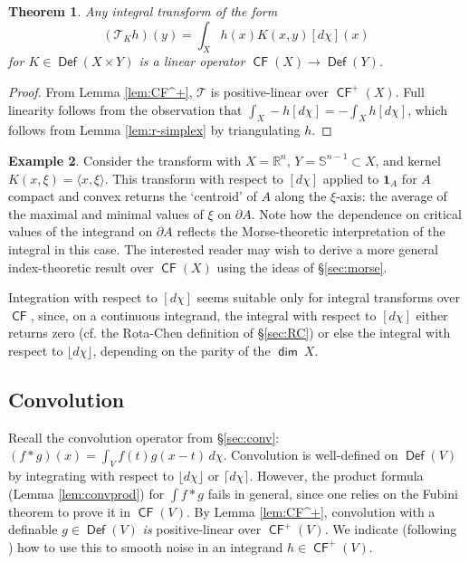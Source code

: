 \documentclass{psapm-l}
\newtheorem{theorem}{Theorem}[section]
\theoremstyle{definition}
\newtheorem{example}[theorem]{Example}
\theoremstyle{remark}
\numberwithin{equation}{section}
\begin{document}
\begin{theorem}
\label{thm:lineartransform}
Any integral transform of the form
\begin{equation}
    ({{\mathcal T}}_K h)(y)
    =  \int_X h(x)K(x,y) [d\chi](x)
\end{equation}
for $K\in{{{\operatorname{\mathsf{{Def}}}}}}(X\times Y)$ is a linear operator ${{{\operatorname{\mathsf{{CF}}}}}}(X)\to{{{\operatorname{\mathsf{{Def}}}}}}(Y)$.
\end{theorem}
\begin{proof}
From Lemma \ref{lem:CF^+}, ${{\mathcal T}}$ is positive-linear over ${{{\operatorname{\mathsf{{CF}}}}}}^+(X)$. Full linearity follows from the observation that $\int_{X} -h [d\chi]  = -\int_{X} h [d\chi]$, which follows from Lemma \ref{lem:r-simplex} by triangulating $h$.
\end{proof}

\begin{example}
Consider the transform with $X={{\mathbb R}}^n$, $Y={{\mathbb S}}^{n-1}\subset X$, and kernel $K(x,\xi)=\langle x,\xi\rangle$. This transform with respect to $[d\chi]$ applied to ${{\mathbf{1}}}_A$ for $A$ compact and convex returns the `centroid' of $A$ along the $\xi$-axis: the average of the maximal and minimal values of $\xi$ on $\partial A$. Note how the dependence on critical values of the integrand on $\partial A$ reflects the Morse-theoretic interpretation of the integral in this case. The interested reader may wish to derive a more general index-theoretic result over ${{{\operatorname{\mathsf{{CF}}}}}}(X)$ using the ideas of \S\ref{sec:morse}.
\end{example}

Integration with respect to $[d\chi]$ seems suitable only for integral transforms over ${{{\operatorname{\mathsf{{CF}}}}}}$, since, on a continuous integrand, the integral with respect to $[d\chi]$ either returns zero (cf. the Rota-Chen definition of \S\ref{sec:RC}) or else the integral with respect to ${{\lfloor d\chi\rfloor}}$, depending on the parity of the ${{{\operatorname{\mathsf{{dim}}}}}}\ X$.

\subsection{Convolution}
\label{sec:convolution}

Recall the convolution operator from \S\ref{sec:conv}: $(f*g)(x) = \int_V f(t)g(x-t)\,d\chi$. Convolution is well-defined on ${{{\operatorname{\mathsf{{Def}}}}}}(V)$ by integrating with respect to ${{\lfloor d\chi\rfloor}}$ or ${{\lceil d\chi\rceil}}$. However, the product formula (Lemma \ref{lem:convprod}) for $\int f*g$ fails in general, since one relies on the Fubini theorem to prove it in ${{{\operatorname{\mathsf{{CF}}}}}}(V)$. By Lemma \ref{lem:CF^+}, convolution with a definable $g\in{{{\operatorname{\mathsf{{Def}}}}}}(V)$ {\em is} positive-linear over ${{{\operatorname{\mathsf{{CF}}}}}}^+(V)$. We indicate (following \cite{BG:PNAS}) how to use this to smooth noise in an integrand $h\in{{{\operatorname{\mathsf{{CF}}}}}}^+(V)$.
\end{document}
